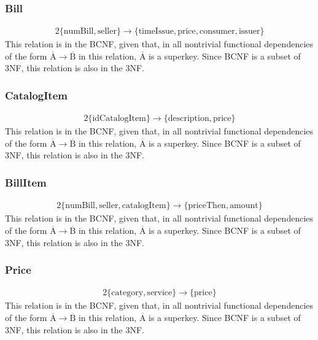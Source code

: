 \documentclass{report}[a4paper]
\theoremstyle{remark}
\begin{document}
\subsubsection{Bill}
\begin{alignat*}{2}
    \{\text{numBill},\text{seller}\} \rightarrow \{\text{timeIssue},\text{price},\text{consumer},\text{issuer}\}
\end{alignat*}
This relation is in the BCNF, given that, in all nontrivial functional dependencies of the form $\overline{\text{A}} \rightarrow \overline{\text{B}}$ in this relation, $\overline{\text{A}}$ is a superkey. Since BCNF is a subset of 3NF, this relation is also in the 3NF.
\subsubsection{CatalogItem}
\begin{alignat*}{2}
    \{\text{idCatalogItem}\} \rightarrow \{\text{description},\text{price}\}
\end{alignat*}
This relation is in the BCNF, given that, in all nontrivial functional dependencies of the form $\overline{\text{A}} \rightarrow \overline{\text{B}}$ in this relation, $\overline{\text{A}}$ is a superkey. Since BCNF is a subset of 3NF, this relation is also in the 3NF.
\subsubsection{BillItem}
\begin{alignat*}{2}
    \{\text{numBill},\text{seller},\text{catalogItem}\} \rightarrow \{\text{priceThen},\text{amount}\}
\end{alignat*}
This relation is in the BCNF, given that, in all nontrivial functional dependencies of the form $\overline{\text{A}} \rightarrow \overline{\text{B}}$ in this relation, $\overline{\text{A}}$ is a superkey. Since BCNF is a subset of 3NF, this relation is also in the 3NF.
\subsubsection{Price}
\begin{alignat*}{2}
    \{\text{category},\text{service}\} \rightarrow \{\text{price}\}
\end{alignat*}
This relation is in the BCNF, given that, in all nontrivial functional dependencies of the form $\overline{\text{A}} \rightarrow \overline{\text{B}}$ in this relation, $\overline{\text{A}}$ is a superkey. Since BCNF is a subset of 3NF, this relation is also in the 3NF.
\end{document}
